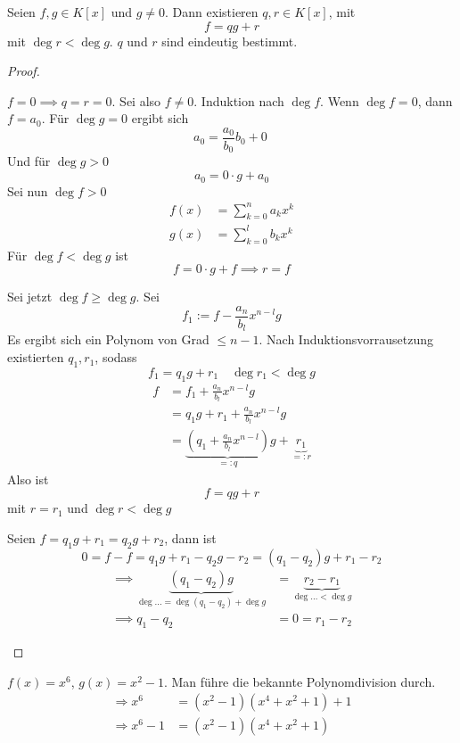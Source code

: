 \documentclass{mycourse}
\begin{document}
\begin{thm}
\label{thm:10.14}
Seien $f,g\in K[x]$ und $g\neq 0$.
Dann existieren $q,r\in K[x]$, mit
\[
f=qg+r
\]
mit $\deg r < \deg g$.
$q$ und $r$ sind eindeutig bestimmt.

\begin{proof}
	\begin{seg}[Existenz]
		$f=0 \implies q=r=0$.
Sei also $f\neq 0$.
Induktion nach $\deg f$.
Wenn $\deg f = 0$, dann $f=a_0$.
Für $\deg g=0$ ergibt sich
\[
a_0=\frac {a_0}{b_0}b_0 + 0\
\]
Und für $\deg g > 0$
\[
a_0=0\cdot g + a_0
\]
Sei nun $\deg f>0$
\begin{align*}
f(x)&=\sum_{k=0}^na_kx^k\\
g(x)&=\sum_{k=0}^lb_kx^k
\end{align*}
Für $\deg f < \deg g$ ist
\[
f=0\cdot g + f \implies r=f
\]

Sei jetzt $\deg f\ge \deg g$.
Sei
\[
f_1:=f-\frac{a_n}{b_l}x^{n-l}g
\]
Es ergibt sich ein Polynom von Grad $\le n-1$.
Nach Induktionsvorrausetzung existierten $q_1,r_1$, sodass
\[
f_1=q_1g+r_1 \quad \deg r_1<\deg g
\]
\begin{align*}
f&=f_1+\frac {a_n}{b_l}x^{n-l}g\\
&=q_1g+r_1+\frac {a_n}{b_l}x^{n-l}g\\
&=\underbrace{\left(q_1+\frac{a_n}{b_l}x^{n-l}\right)}_{=:q}g+\underbrace{r_1}_{=:r}
\end{align*}
Also ist
\[
f=qg+r
\]
mit $r=r_1$ und $\deg r<\deg g$
\end{seg}
\begin{seg}[Eindeutigkeit]

Seien $f=q_1g+r_1=q_2g+r_2$, dann ist
\[
0=f-f=q_1g+r_1-q_2g-r_2=(q_1-q_2)g+r_1-r_2
\]
\begin{align*}
\implies \underbrace{(q_1-q_2)g}_{\deg{\dotsc}=\deg(q_1-q_2)+\deg g} &=\underbrace{r_2-r_1}_{\deg{\dotsc}<\deg g}\\
\implies q_1-q_2&=0=r_1-r_2
\end{align*}
\end{seg}
\end{proof}
\end{thm}

\begin{ex}
$f(x)=x^6$, $g(x)=x^2-1$.
Man führe die bekannte Polynomdivision durch.
\begin{align*}
\Rightarrow x^6&=(x^2-1)(x^4+x^2+1)+1 \\
\Rightarrow x^6-1 &= (x^2-1)(x^4+x^2+1)
\end{align*}
\end{ex}
\end{document}
